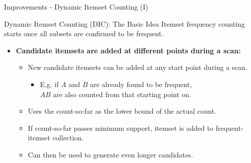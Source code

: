 \begin{frame}{Improvements - Dynamic Itemset Counting (I)}
	\begin{block}{Dynamic Itemset Counting (DIC): The Basic Idea}
		Itemset frequency counting starts once all subsets are confirmed to be frequent.
	\end{block}

	\begin{itemize}
		\item \textbf{Candidate itemsets are added at different points during a scan:}
		      \begin{itemize}
			      \item New candidate itemsets can be added at any start point during a scan.
			            \begin{itemize}
				            \item E.g. if $A$ and $B$ are already found to be frequent, \\
				                  $AB$ are also counted from that starting point on.
			            \end{itemize}
			      \item Uses the count-so-far as the lower bound of the actual count.
			      \item If count-so-far passes minimum support, itemset is added to
			            frequent-itemset collection.
			      \item Can then be used to generate even longer candidates.
		      \end{itemize}
	\end{itemize}
\end{frame}

